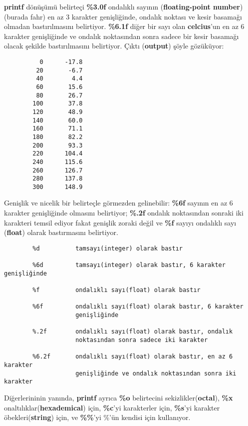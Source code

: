 \documentclass[a4paper,12pt,oneside]{book}
\begin{document}
\par \textbf{printf} dönüşümü belirteçi \textbf{\%3.0f} ondalıklı sayının (\textbf{floating-point number}) (burada fahr) en az 3 karakter genişliğinde, ondalık noktası ve kesir basamağı olmadan bastırılmasını belirtiyor. \textbf{\%6.1f} diğer bir sayı olan \textbf{celcius}'un  en az 6 karakter genişliğinde ve ondalık noktasından sonra sadece bir kesir basamağı olacak şekilde bastırılmasını belirtiyor.
Çıktı (\textbf{output}) şöyle gözüküyor:
\begin{lstlisting}
          0      -17.8
         20       -6.7
         40        4.4
         60       15.6
         80       26.7
        100       37.8
        120       48.9
        140       60.0
        160       71.1
        180       82.2
        200       93.3
        220      104.4
        240      115.6
        260      126.7
        280      137.8
        300      148.9
\end{lstlisting}

Genişlik ve nicelik bir belirteçle görmezden gelinebilir: \textbf{\%6f} sayının en az 6 karakter genişliğinde olmasını belirtiyor; \textbf{\%.2f} ondalık noktasından sonraki iki karakteri temsil ediyor fakat genişlik zoraki değil ve \textbf{\%f} sayıyı ondalıklı sayı (\textbf{float}) olarak bastırmasını belirtiyor. \pagebreak

\begin{lstlisting}
        %d          tamsayı(integer) olarak bastır

        %6d         tamsayı(integer) olarak bastır, 6 karakter genişliğinde

        %f          ondalıklı sayı(float) olarak bastır

        %6f         ondalıklı sayı(float) olarak bastır, 6 karakter
                    genişliğinde

        %.2f        ondalıklı sayı(float) olarak bastır, ondalık
                    noktasından sonra sadece iki karakter

        %6.2f       ondalıklı sayı(float) olarak bastır, en az 6 karakter
                    genişliğinde ve ondalık noktasından sonra iki karakter
\end{lstlisting} Diğerlerininin yanında, \textbf{printf} ayrıca \textbf{\%o} belirtecini sekizlikler(\textbf{octal}), \textbf{\%x} onaltılıklar(\textbf{hexademical}) için, \textbf{\%c}'yi karakterler için, \textbf{\%s}'yi karakter öbekleri(\textbf{string}) için, ve \textbf{\%\%}'yi \%'ün kendisi için kullanıyor. \\
\end{document}
